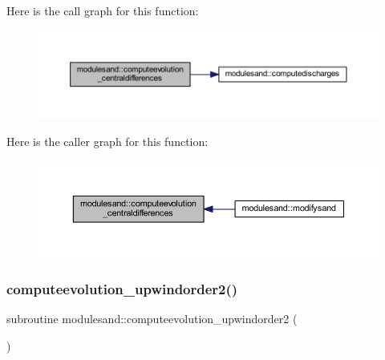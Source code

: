 Here is the call graph for this function\+:\nopagebreak
\begin{figure}[H]
\begin{center}
\leavevmode
\includegraphics[width=350pt]{namespacemodulesand_a0a0730547aa0d650a7bcc24395ba4cea_cgraph}
\end{center}
\end{figure}
Here is the caller graph for this function\+:\nopagebreak
\begin{figure}[H]
\begin{center}
\leavevmode
\includegraphics[width=350pt]{namespacemodulesand_a0a0730547aa0d650a7bcc24395ba4cea_icgraph}
\end{center}
\end{figure}
\mbox{\label{namespacemodulesand_ade72cd18189ac41b25eef5f7f97591dc}} 
\subsubsection{\texorpdfstring{computeevolution\+\_\+upwindorder2()}{computeevolution\_upwindorder2()}}
{\footnotesize\ttfamily subroutine modulesand\+::computeevolution\+\_\+upwindorder2 (\begin{DoxyParamCaption}{ }\end{DoxyParamCaption})\hspace{0.3cm}{\ttfamily [private]}}

